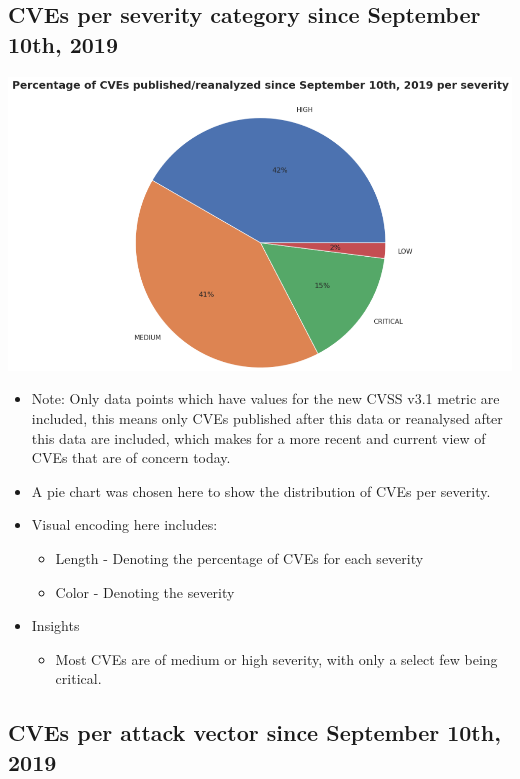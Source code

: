 \documentclass[a4paper, 11pt]{article}
\begin{document}
\subsection{CVEs per severity category since September 10th, 2019}
\label{sec:orgbbac894}

\begin{center}
\includegraphics[width=.9\linewidth]{./charts/cve_severity.png}
\end{center}

\begin{itemize}
\item Note: Only data points which have values for the new CVSS v3.1 metric are included, this means only CVEs published after this data or reanalysed after this data are included, which makes for a more recent and current view of CVEs that are of concern today.
\item A pie chart was chosen here to show the distribution of CVEs per severity.
\item Visual encoding here includes:
\begin{itemize}
\item Length - Denoting the percentage of CVEs for each severity
\item Color - Denoting the severity
\end{itemize}
\item Insights
\begin{itemize}
\item Most CVEs are of medium or high severity, with only a select few being critical.
\end{itemize}
\end{itemize}
\subsection{CVEs per attack vector since September 10th, 2019}
\label{sec:org9f3e4ef}
\end{document}

